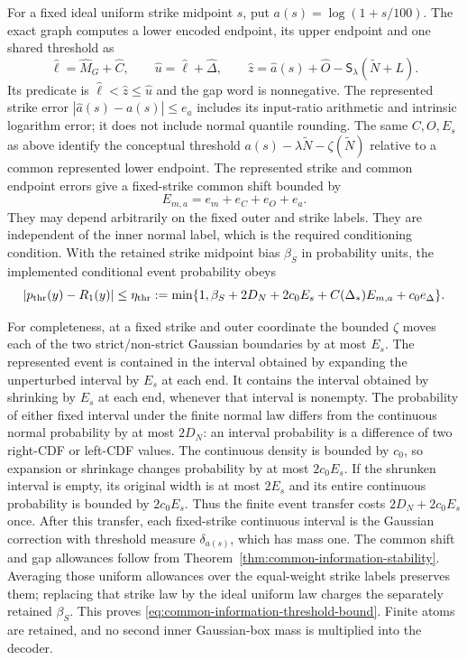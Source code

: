 For a fixed ideal uniform strike midpoint $s$, put $a(s)=\log(1+s/100)$.
The exact graph computes a lower encoded endpoint, its upper endpoint
and one shared threshold as
\begin{equation}
 \widehat\ell=\widehat M_G+\widehat C,\qquad
 \widehat u=\widehat\ell+\widehat\Delta,\qquad
 \widehat z=\widehat a(s)+\widehat O
                       -\mathsf S_\lambda(\widetilde N+L).
 \label{eq:common-information-threshold-endpoints}
\end{equation}
Its predicate is $\widehat\ell<\widehat z\leq\widehat u$ and the gap
word is nonnegative. The represented strike error
$|\widehat a(s)-a(s)|\leq e_a$ includes its input-ratio arithmetic
and intrinsic logarithm error; it does not include normal quantile
rounding. The same $C,O,E_s$ as above identify the conceptual threshold
$a(s)-\lambda\widetilde N-\zeta(\widetilde N)$ relative to a common
represented lower endpoint. The represented strike and common endpoint
errors give a fixed-strike common shift bounded by
\begin{equation}
 E_{m,a}=e_m+e_C+e_O+e_a.
 \label{eq:common-information-threshold-common-error}
\end{equation}
They may depend arbitrarily on the fixed outer and strike labels.
They are independent of the inner normal label, which is the required
conditioning condition. With the retained strike midpoint bias $\beta_S$
in probability units, the implemented conditional event probability
obeys
\begin{equation}
 |p_{\rm thr}(y)-R_1(y)|\leq\eta_{\rm thr}:=
 \min\{1,\beta_S+2D_N+2c_0E_s
                     +C(\Delta_*)E_{m,a}+c_0e_\Delta\}.
 \label{eq:common-information-threshold-bound}
\end{equation}

For completeness, at a fixed strike and outer coordinate the bounded
$\zeta$ moves each of the two strict/non-strict Gaussian boundaries by
at most $E_s$. The represented event is contained in the interval
obtained by expanding the unperturbed interval by $E_s$ at each end.
It contains the interval obtained by shrinking by $E_s$ at each end,
whenever that interval is nonempty. The probability of either fixed
interval under the finite normal law differs from the continuous normal
probability by at most $2D_N$: an interval probability is a difference
of two right-CDF or left-CDF values. The continuous density is bounded
by $c_0$, so expansion or shrinkage changes probability by at most
$2c_0E_s$. If the shrunken interval is empty, its original width is
at most $2E_s$ and its entire continuous probability is bounded by
$2c_0E_s$. Thus the finite event transfer costs $2D_N+2c_0E_s$ once.
After this transfer, each fixed-strike continuous interval is the
Gaussian correction with threshold measure $\delta_{a(s)}$, which has
mass one. The common shift and gap allowances follow from
Theorem~\ref{thm:common-information-stability}. Averaging those uniform
allowances over the equal-weight strike labels preserves them; replacing
that strike law by the ideal uniform law charges the separately retained
$\beta_S$. This proves \eqref{eq:common-information-threshold-bound}.
Finite atoms are retained, and no second inner Gaussian-box mass is
multiplied into the decoder.

